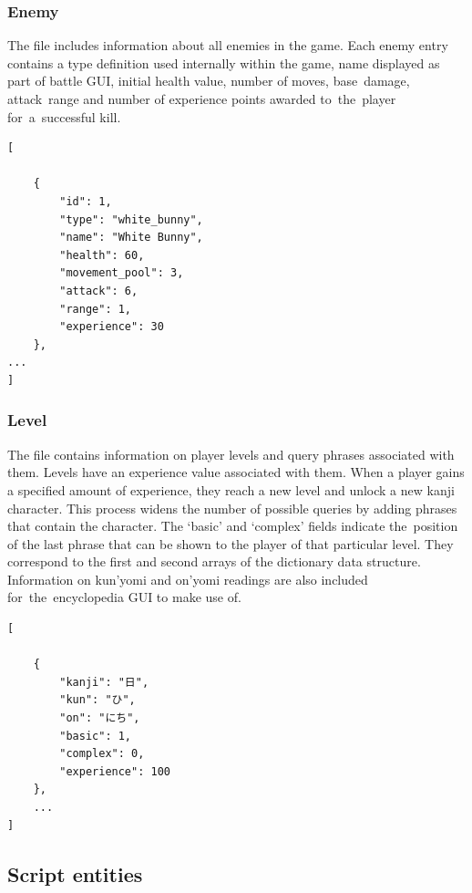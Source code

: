 \documentclass[thesis=B,english,hidelinks]{FITthesisXE}[2012/06/26]
\begin{document}
\subsubsection{Enemy}

The file includes information about all enemies in the game. Each enemy entry contains a type definition used internally within the game, name displayed as part of battle GUI, initial health value, number of moves, base~damage, attack~range and number of experience points awarded to~the~player for~a~successful kill.

\begin{lstlisting}
[

    {
        "id": 1,
        "type": "white_bunny",
        "name": "White Bunny",
        "health": 60,
        "movement_pool": 3,
        "attack": 6,
        "range": 1,
        "experience": 30
    },
...
]
\end{lstlisting}

\newpage

\subsubsection{Level}

The file contains information on player levels and query phrases associated with them. Levels have an experience value associated with them. When a player gains a specified amount of experience, they reach a new level and unlock a new kanji character. This process widens the number of possible queries by adding phrases that contain the character. The `basic' and `complex' fields indicate the~position of the last phrase that can be shown to the player of that particular level. They correspond to the first and second arrays of the dictionary data structure. Information on kun'yomi and on'yomi readings are also included for~the~encyclopedia GUI to make use of.

\begin{lstlisting}
[

    {
        "kanji": "日",
        "kun": "ひ",
        "on": "にち",
        "basic": 1,
        "complex": 0,
        "experience": 100
    },
    ...
]
\end{lstlisting}

\newpage

\subsection{Script entities}
\end{document}
